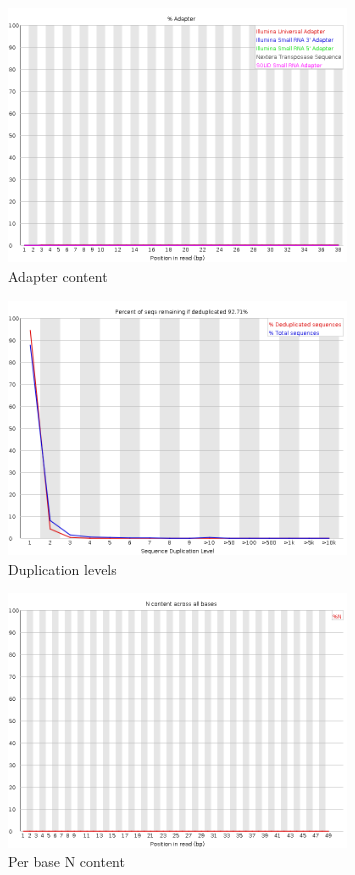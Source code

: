 \documentclass[UTF8]{ctexart}
\begin{document}
\begin{figure}[!htb]
	\centering
	\includegraphics[width=0.8\textwidth]{img/SRR14325859_FastQC_Origin_img/adapter_content.png}	
	\caption{Adapter content\protect}    
\end{figure}

\begin{figure}[!htb]
	\centering
	\includegraphics[width=0.8\textwidth]{img/SRR14325859_FastQC_Origin_img/duplication_levels.png}	
	\caption{Duplication levels\protect}    
\end{figure}

\begin{figure}[!htb]
	\centering
	\includegraphics[width=0.8\textwidth]{img/SRR14325859_FastQC_Origin_img/per_base_n_content.png}	
	\caption{Per base N content\protect}    
\end{figure}
\end{document}
